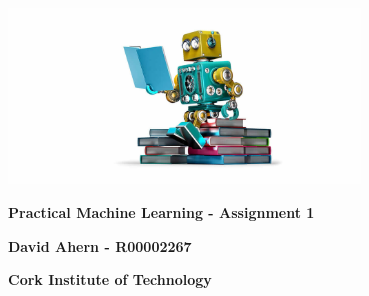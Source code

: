 \begin{titlepage}
    \begin{center}
    	\includegraphics[width=0.7\textwidth]{images/Machine-Learning-hero.jpg}
    	
        \vspace*{1cm}
        
        \textbf{Practical Machine Learning - Assignment 1}
        
        \vspace{1.5cm}
        
        \textbf{David Ahern - R00002267}
        
        \vspace{0.5cm}
        \textbf{Cork Institute of Technology}
        
    \end{center}
\end{titlepage}